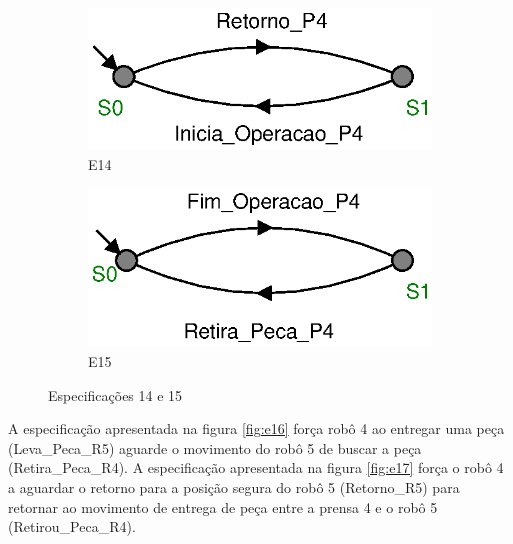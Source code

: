 \begin{figure}[H]%
  \centering
  \begin{subfigure}{0.45\textwidth}
      \centering
      \includegraphics[width=\textwidth]{imagens/E14.eps}
      \caption{E14}
      \label{fig:e14}
  \end{subfigure}
  \hfill
  \begin{subfigure}{0.45\textwidth}
      \centering
      \includegraphics[width=\textwidth]{imagens/E15.eps}
      \caption{E15}
      \label{fig:e15}
  \end{subfigure}
  \caption{Especificações 14 e 15}
  \label{fig:e1415}
\end{figure}

A especificação apresentada na figura \ref{fig:e16} força robô 4 ao entregar uma peça (Leva\_Peca\_R5) aguarde o movimento do robô 5 de buscar a peça (Retira\_Peca\_R4).
A especificação apresentada na figura \ref{fig:e17} força o robô 4 a aguardar o retorno para a posição segura do robô 5 (Retorno\_R5) para retornar ao movimento de entrega de peça entre a prensa 4 e o robô 5 (Retirou\_Peca\_R4).

